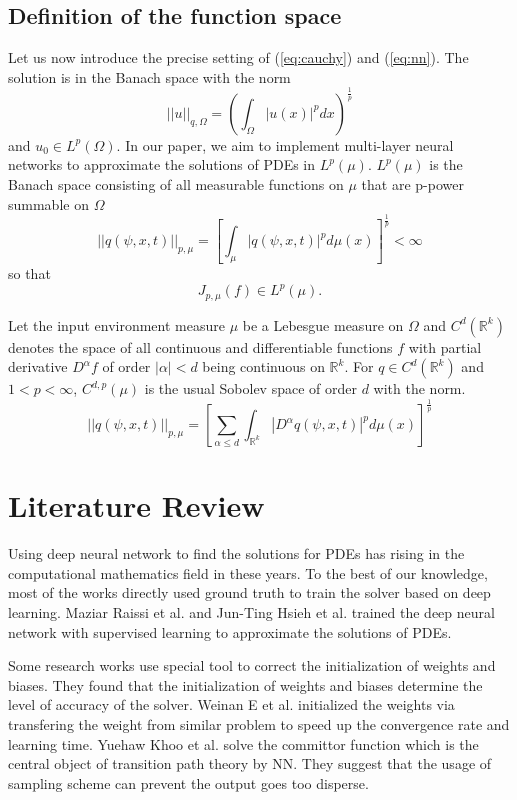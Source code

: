 \documentclass{article}
\begin{document}
		\subsection{Definition of the function space}
		Let us now introduce the precise setting of (\ref{eq:cauchy}) and (\ref{eq:nn}).
The solution is in the Banach space with the norm
		\begin{equation}
		||u||_{q,\Omega} = \left(\int_{\Omega} |u(x)|^{p} dx\right)^{\frac{1}{p}}
		\end{equation}
		and $u_{0} \in L^{p}(\Omega)$.
In our paper, we aim to implement multi-layer neural networks to approximate the solutions of PDEs in $L^{p}(\mu)$.
$L^{p}(\mu)$ is the Banach space consisting of all measurable functions on $\mu$ that are p-power summable on $\Omega$
		\begin{equation}
		||q(\psi,x,t)||_{p,\mu} = \left[\int_{\mu} |q(\psi,x,t)|^{p} d\mu(x)\right]^{\frac{1}{p}} < \infty
		\end{equation}
		so that
		\begin{equation}
		J_{p,\mu}(f)  \in L^{p}(\mu).
		\end{equation}

		Let the input environment measure $\mu$ be a Lebesgue measure on $\Omega$
and $C^{d}(\mathbb{R}^{k})$ denotes the space of all continuous
and differentiable functions $f$ with partial derivative $D^{\alpha}f$ of order $|\alpha| < d$ being continuous on $\mathbb{R}^{k}$.
For $q \in C^{d}(\mathbb{R}^{k})$ and $1 < p < \infty$, $C^{d,p}(\mu)$ is the usual Sobolev space of order $d$ with the norm.
		\begin{equation}
||q(\psi,x,t)||_{p,\mu} = \left[ \sum_{\alpha \leq d} \int_{\mathbb{R}^{k}} |D^{\alpha}q(\psi,x,t)|^{p} d \mu(x)\right]^{\frac{1}{p}}
		\end{equation}

\section{Literature Review}

Using deep neural network to find the solutions for PDEs has rising in the computational mathematics field in these years. 
To the best of our knowledge, most of the works directly used ground truth to train the solver based on deep learning. 
Maziar Raissi et al. \cite{raissi}  and Jun-Ting Hsieh et al. \cite{hsieh} trained the deep neural network with supervised learning to approximate the solutions of PDEs. 

Some research works use special tool to correct the initialization of weights and biases. 
They found that the initialization of weights and biases determine the level of accuracy of the solver. 
Weinan E et al. \cite{weinan} initialized the weights via transfering the weight from similar problem to speed up the convergence rate and learning time. 
Yuehaw Khoo et al. solve the committor function which is the central object of transition path theory by NN. They suggest that the usage of sampling scheme can prevent the output goes too disperse. 
\end{document}
